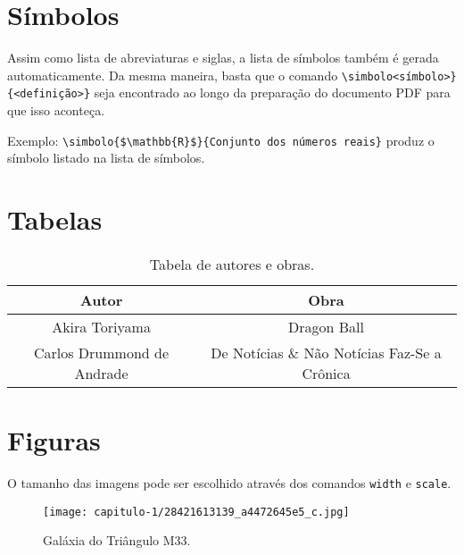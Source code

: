 \section{Símbolos}

Assim como lista de abreviaturas e siglas, a lista de símbolos também é gerada automaticamente. Da mesma maneira, basta que o comando \verb|\simbolo<símbolo>}| \verb|{<definição>}| seja encontrado ao longo da preparação do documento PDF para que isso aconteça.

Exemplo: \verb|\simbolo{$\mathbb{R}$}{Conjunto dos números reais}| produz o símbolo listado na lista de símbolos. 

\section{Tabelas}

\begin{table}
    \centering
    \begin{tabular}{c | c}
        \hline
        Autor & Obra \\
        \hline
        Akira Toriyama & Dragon Ball \\
        Carlos Drummond de Andrade & De Notícias \& Não Notícias Faz-Se a Crônica
    \end{tabular}
    \caption[Tabela]{Tabela de autores e obras.}
    \label{table:1}
\end{table}

\section{Figuras}

O tamanho das imagens pode ser escolhido através dos comandos \verb|width| e \verb|scale|.

\begin{figure}[h!]
    \centering
    \texttt{[image: capitulo-1/28421613139\_a4472645e5\_c.jpg]}
    \caption[Galáxia M33]{Galáxia do Triângulo M33.}
\end{figure}

